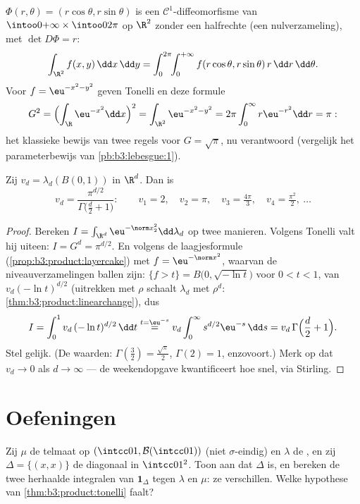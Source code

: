 \begin{example}
\label{ex:b3:product:polar}
$\Phi(r, \theta) = (r\cos\theta, r\sin\theta)$ is een $\mathcal
C^1$-diffeomorfisme van $\intoo0{+\infty}\times\intoo0{2\pi}$ op
$\R^2$ zonder een halfrechte (een nulverzameling), met $\det D\Phi
= r$:
\[
\int_{\R^2}f(x, y)\,\dd x\,\dd y
= \int_0^{2\pi}\!\!\int_0^{+\infty}
f(r\cos\theta, r\sin\theta)\,r\,\dd r\,\dd\theta .
\]
Voor $f = \eu^{-x^2-y^2}$ geven Tonelli en deze formule
\[
G^2 = \Bigl(\int_\R \eu^{-x^2}\dd x\Bigr)^2
= \int_{\R^2}\eu^{-x^2-y^2}
= 2\pi\int_0^\infty r\eu^{-r^2}\dd r = \pi:
\]
het klassieke bewijs van twee regels voor $G = \sqrt\pi$, nu
 verantwoord (vergelijk het parameterbewijs van
\cref{pb:b3:lebesgue:1}).
\end{example}

\begin{theorem}
\label{thm:b3:product:ballvolume}
Zij $v_d = \lambda_d(B(0,1))$ in $\R^d$. Dan is
\[
v_d = \frac{\pi^{d/2}}{\Gamma\bigl(\frac d2 + 1\bigr)} :
\qquad
v_1 = 2,\quad v_2 = \pi,\quad v_3 = \tfrac{4\pi}3,\quad
v_4 = \tfrac{\pi^2}2,\ \dots
\]
\end{theorem}

\begin{proof}
Bereken $I = \int_{\R^d}\eu^{-\norm x_2^2}\dd\lambda_d$ op twee
manieren. Volgens Tonelli valt hij uiteen: $I = G^d = \pi^{d/2}$.
En volgens de laagjesformule (\cref{prop:b3:product:layercake})
met $f = \eu^{-\norm x^2}$, waarvan de niveauverzamelingen ballen
zijn: $\{f > t\} = B\bigl(0, \sqrt{-\ln t}\bigr)$ voor $0 < t <
1$, van  $v_d(-\ln t)^{d/2}$ (uitrekken met $\rho$ schaalt
$\lambda_d$ met $\rho^d$: \cref{thm:b3:product:linearchange}), dus
\[
I = \int_0^1 v_d\,(-\ln t)^{d/2}\,\dd t
\overset{t = \eu^{-s}}{=}
v_d\int_0^\infty s^{d/2}\eu^{-s}\,\dd s
= v_d\,\Gamma\Bigl(\frac d2 + 1\Bigr).
\]
Stel gelijk. (De waarden: $\Gamma(\frac32) = \frac{\sqrt\pi}2$,
$\Gamma(2) = 1$, enzovoort.) Merk op dat $v_d \to 0$ als $d \to
\infty$ --- de weekendopgave kwantificeert hoe snel, via
Stirling.
\end{proof}

\section{Oefeningen}

\begin{exercise}[$\star$]\label{exo:b3:product:1}
Zij $\mu$ de telmaat op $(\intcc01, \mathcal B(\intcc01))$ (niet
$\sigma$-eindig) en $\lambda$ de , en zij $\Delta =
\{(x,x)\}$ de diagonaal in $\intcc01^2$. Toon aan dat $\Delta$
 is, en bereken de twee herhaalde integralen van $\mathbf
1_\Delta$ tegen $\lambda$ en $\mu$: ze verschillen. Welke
hypothese van \cref{thm:b3:product:tonelli} faalt?
\end{exercise}

